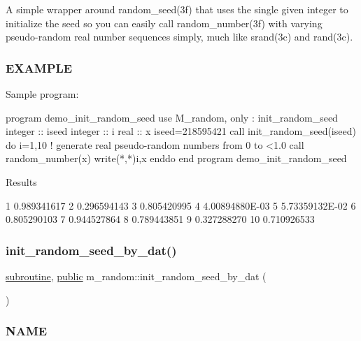 A simple wrapper around random\+\_\+seed(3f) that uses the single given integer to initialize the seed so you can easily call random\+\_\+number(3f) with varying pseudo-\/random real number sequences simply, much like srand(3c) and rand(3c). \subsubsection*{E\+X\+A\+M\+P\+LE}

\begin{DoxyVerb}Sample program:

 program demo_init_random_seed
 use M_random, only : init_random_seed
 integer :: iseed
 integer :: i
 real    :: x
    iseed=218595421
    call init_random_seed(iseed)
    do i=1,10
       ! generate real pseudo-random numbers from 0 to <1.0
       call random_number(x)
       write(*,*)i,x
    enddo
 end program demo_init_random_seed

Results

        1  0.989341617
        2  0.296594143
        3  0.805420995
        4   4.00894880E-03
        5   5.73359132E-02
        6  0.805290103
        7  0.944527864
        8  0.789443851
        9  0.327288270
       10  0.710926533 \end{DoxyVerb}
 \mbox{\label{namespacem__random_a6e3975f994c77778043f3e5d00614317}} 
\subsubsection{\texorpdfstring{init\+\_\+random\+\_\+seed\+\_\+by\+\_\+dat()}{init\_random\_seed\_by\_dat()}}
{\footnotesize\ttfamily \hyperlink{M__stopwatch_83_8txt_acfbcff50169d691ff02d4a123ed70482}{subroutine}, \hyperlink{M__stopwatch_83_8txt_a2f74811300c361e53b430611a7d1769f}{public} m\+\_\+random\+::init\+\_\+random\+\_\+seed\+\_\+by\+\_\+dat (\begin{DoxyParamCaption}{ }\end{DoxyParamCaption})}



\subsubsection*{N\+A\+ME}

